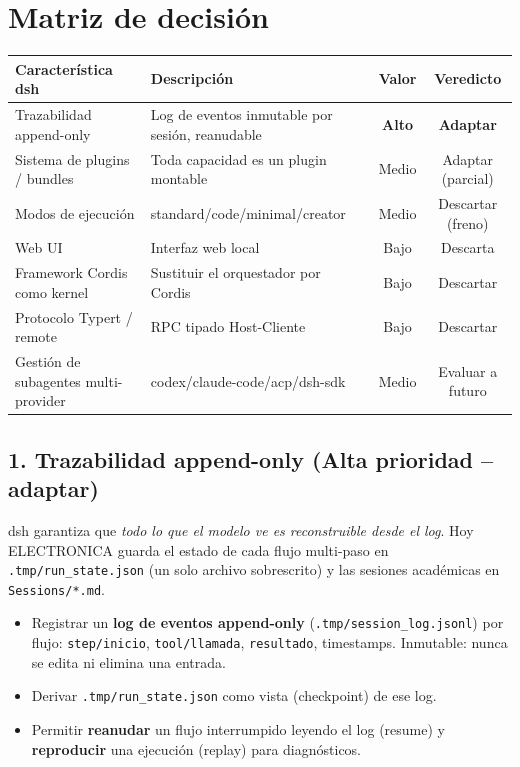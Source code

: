 \documentclass[11pt,a4paper]{article}
\begin{document}
\section{Matriz de decisión}

\begin{table}[htbp]
\centering
\small
\begin{tabularx}{\linewidth}{>{\raggedright\arraybackslash}p{3.4cm} X c c}
\toprule
\textbf{Característica dsh} & \textbf{Descripción} & \textbf{Valor} & \textbf{Veredicto} \\
\midrule
Trazabilidad append-only & Log de eventos inmutable por sesión, reanudable & \textbf{Alto} & \textbf{Adaptar} \\
Sistema de plugins / bundles & Toda capacidad es un plugin montable & Medio & Adaptar (parcial) \\
Modos de ejecución & standard/code/minimal/creator & Medio & Descartar (freno) \\
Web UI & Interfaz web local & Bajo & Descarta \\
Framework Cordis como kernel & Sustituir el orquestador por Cordis & Bajo & Descartar \\
Protocolo Typert / remote & RPC tipado Host-Cliente & Bajo & Descartar \\
Gestión de subagentes multi-provider & codex/claude-code/acp/dsh-sdk & Medio & Evaluar a futuro \\
\bottomrule
\end{tabularx}
\end{table}

\subsection{1. Trazabilidad append-only (Alta prioridad -- adaptar)}

dsh garantiza que \textit{todo lo que el modelo ve es reconstruible desde el log}. Hoy
ELECTRONICA guarda el estado de cada flujo multi-paso en \texttt{.tmp/run\_state.json}
(un solo archivo sobrescrito) y las sesiones académicas en \texttt{Sessions/*.md}.

\begin{tcolorbox}[cajaFortaleza, title={\faIcon{check-circle}~Qué incorporar por analogía}]
\begin{itemize}[leftmargin=*,topsep=2pt,itemsep=1pt]
  \item Registrar un \textbf{log de eventos append-only} (\texttt{.tmp/session\_log.jsonl})
        por flujo: \texttt{step/inicio}, \texttt{tool/llamada}, \texttt{resultado}, timestamps.
        Inmutable: nunca se edita ni elimina una entrada.
  \item Derivar \texttt{.tmp/run\_state.json} como vista (checkpoint) de ese log.
  \item Permitir \textbf{reanudar} un flujo interrumpido leyendo el log (resume) y
        \textbf{reproducir} una ejecución (replay) para diagnósticos.
\end{itemize}
\end{tcolorbox}
\end{document}
